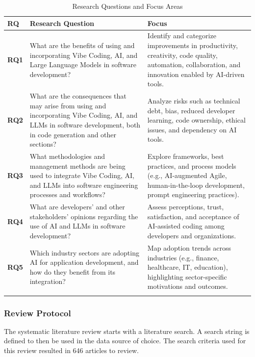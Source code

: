 {\small
\begin{longtable}{p{0.7cm} p{7.5cm} p{6.5cm}}
\caption{Research Questions and Focus Areas}
\label{tab:RQs} \\
\toprule
\textbf{RQ} & \textbf{Research Question} & \textbf{Focus} \\
\midrule
\endfirsthead

\bottomrule
\endlastfoot

\textbf{RQ1} & What are the benefits of using and incorporating Vibe Coding, AI, and Large Language Models in software development? & Identify and categorize improvements in productivity, creativity, code quality, automation, collaboration, and innovation enabled by AI-driven tools. \\
\addlinespace

\textbf{RQ2} & What are the consequences that may arise from using and incorporating Vibe Coding, AI, and LLMs in software development, both in code generation and other sections? & Analyze risks such as technical debt, bias, reduced developer learning, code ownership, ethical issues, and dependency on AI tools. \\
\addlinespace

\textbf{RQ3} & What methodologies and management methods are being used to integrate Vibe Coding, AI, and LLMs into software engineering processes and workflows? & Explore frameworks, best practices, and process models (e.g., AI-augmented Agile, human-in-the-loop development, prompt engineering practices). \\
\addlinespace

\textbf{RQ4} & What are developers’ and other stakeholders’ opinions regarding the use of AI and LLMs in software development? & Assess perceptions, trust, satisfaction, and acceptance of AI-assisted coding among developers and organizations. \\
\addlinespace

\textbf{RQ5} & Which industry sectors are adopting AI for application development, and how do they benefit from its integration? & Map adoption trends across industries (e.g., finance, healthcare, IT, education), highlighting sector-specific motivations and outcomes. \\
\addlinespace

\end{longtable}}

\subsubsection{Review Protocol}
The systematic literature review starts with a literature search. A search string is defined to then be used in the data source of choice. The search criteria used for this review resulted in 646 articles to review.

